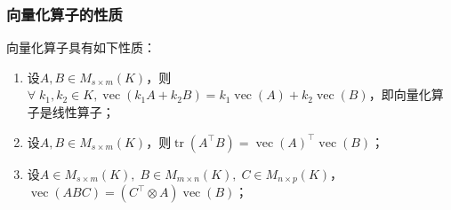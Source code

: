 \subsubsection{向量化算子的性质}
\begin{property}\label{prop:VecOperator}
	向量化算子具有如下性质：
	\begin{enumerate}
		\item 设$A,B\in M_{s\times m}(K)$，则$\forall\;k_1,k_2\in K, \operatorname{vec}(k_1A+k_2B)=k_1\operatorname{vec}(A)+k_2\operatorname{vec}(B)$，即向量化算子是线性算子；
		\item 设$A,B\in M_{s\times m}(K)$，则$\operatorname{tr}(A^{\top}B)=\operatorname{vec}(A)^{\top}\operatorname{vec}(B)$；
		\item 设$A\in M_{s\times m}(K),\;B\in M_{m\times n}(K),\;C\in M_{n\times p}(K)$，$\operatorname{vec}(ABC)=(C^{\top}\otimes A)\operatorname{vec}(B)$；
	\end{enumerate}
\end{property}
